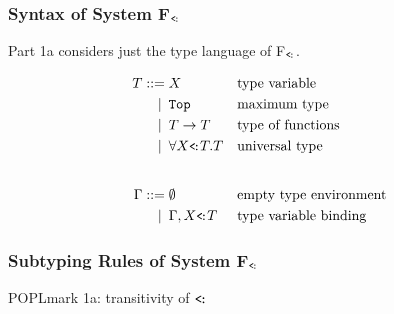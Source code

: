 \documentclass[notheorems]{beamer}
\begin{document}
\begin{frame}

  \frametitle{Syntax of System F$_\texttt{<\!:}$}

  Part 1a considers just the type language of F$_\texttt{<\!:}$.

  \begin{align*}
    T ::=             &\; X
    && \text{type variable} \\
    \llap{\textbar\:} &\; \texttt{Top}
    && \text{maximum type} \\
    \llap{\textbar\:} &\; T \rightarrow T
    && \text{type of functions} \\
    \llap{\textbar\:} &\; \forall X\texttt{\small<\!:}T.T
    && \text{universal type} \\[2em]
    \Gamma ::=        &\; \emptyset
    && \text{empty type environment} \\
    \llap{\textbar\:} &\; \Gamma, X \texttt{\small<\!:}T
    && \text{type variable binding} \\
  \end{align*}

\end{frame}


\begin{frame}

  \frametitle{Subtyping Rules of System F$_\texttt{<\!:}$}


  POPLmark 1a: transitivity of $\texttt{<\!:}$

\end{frame}
\end{document}
